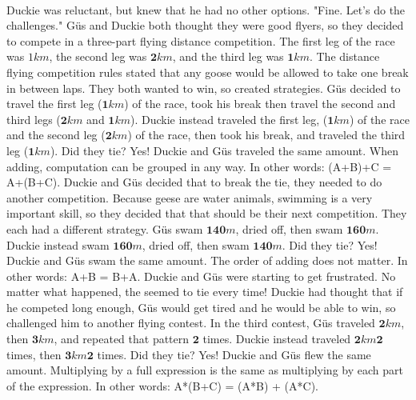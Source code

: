 \paragraph{} Duckie was reluctant, but knew that he had no other options. "Fine. Let's do the challenges."
\pagebreak
{}
{Güs and Duckie both thought they were good flyers, so they decided to compete in a three-part flying distance competition. The first leg of the race was $1 km$, the second leg was $\mathbf{2} km$, and the third leg was $\mathbf{1} km$. The distance flying competition rules stated that any goose would be allowed to take one break in between laps. They both wanted to win, so created strategies. Güs decided to travel the first leg ($\mathbf{1} km$) of the race, took his break then travel the second and third legs ($\mathbf{2} km$ and $\mathbf{1} km$). Duckie instead traveled the first leg, ($\mathbf{1} km$) of the race and the second leg ($\mathbf{2} km$) of the race, then took his break, and traveled the third leg ($\mathbf{1} km$). Did they tie?}
{Yes! Duckie and Güs traveled the same amount.}
{When adding, computation can be grouped in any way. In other words: (A+B)+C = A+(B+C).}
{}
{Duckie and Güs decided that to break the tie, they needed to do another competition. \linebreak Because geese are water animals, swimming is a very important skill, so they decided that that should be their next competition. They each had a different strategy. Güs swam $\mathbf{140} m$, dried off, then swam $\mathbf{160} m$. Duckie instead swam $\mathbf{160} m$, dried off, then swam $\mathbf{140} m$. Did they tie?}
{Yes! Duckie and Güs swam the same amount.}
{The order of adding does not matter. In other words: A+B = B+A.}
{}
{Duckie and Güs were starting to get frustrated. No matter what happened, the seemed to tie every time! Duckie had thought that if he competed long enough, Güs would get tired and he would be able to win, so challenged him to another flying contest. In the third contest, Güs traveled $\mathbf{2} km$, then $\mathbf{3} km$, and repeated that pattern $\mathbf{2}$ times. Duckie instead traveled $\mathbf{2} km  \mathbf{2}$ times, then $\mathbf{3} km  \mathbf{2}$ times. Did they tie?}
{Yes! Duckie and Güs flew the same amount.}
{Multiplying by a full expression is the same as multiplying by each part of the expression. In other words: A*(B+C) = (A*B) + (A*C).}
